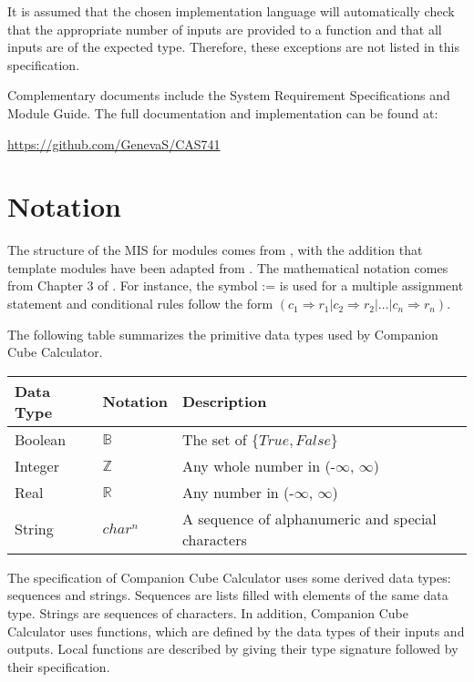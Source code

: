 \documentclass[12pt, titlepage]{article}
\newcommand{\progname}{Companion Cube Calculator}
\begin{document}
It is assumed that the chosen implementation language will automatically check 
that the appropriate number of inputs are provided to a function and that all 
inputs are of the expected type. Therefore, these exceptions are not listed in 
this specification.

Complementary documents include the System Requirement Specifications
and Module Guide. The full documentation and implementation can be
found at:
\begin{center}
	\href{https://github.com/GenevaS/CAS741}{https://github.com/GenevaS/CAS741}
\end{center}

\newpage

\section{Notation}
The structure of the MIS for modules comes from \citet{HoffmanAndStrooper1995},
with the addition that template modules have been adapted from
\cite{GhezziEtAl2003}.  The mathematical notation comes from Chapter 3 of
\citet{HoffmanAndStrooper1995}.  For instance, the symbol := is used for a
multiple assignment statement and conditional rules follow the form $(c_1
\Rightarrow r_1 | c_2 \Rightarrow r_2 | ... | c_n \Rightarrow r_n )$.

The following table summarizes the primitive data types used by \progname. 

\begin{center}
\renewcommand{\arraystretch}{1.2}
\noindent 
\begin{tabular}{l l p{7.5cm}} 
\toprule 
\textbf{Data Type} & \textbf{Notation} & \textbf{Description}\\ 
\midrule
Boolean & $\mathbb{B}$ & The set of $\{True, False\}$\\
Integer & $\mathbb{Z}$ & Any whole number in (-$\infty$, $\infty$)\\
Real & $\mathbb{R}$ & Any number in (-$\infty$, $\infty$)\\
\multirow{2}{1cm}{String} & \multirow{2}{1cm}{$char^n$} & A sequence of 
alphanumeric and special characters\\
\bottomrule
\end{tabular} 
\end{center}

\noindent
The specification of \progname{} uses some derived data types: sequences and 
strings. Sequences are lists filled with elements of the same data type. Strings
are sequences of characters. In addition, \progname{} uses functions, which
are defined by the data types of their inputs and outputs. Local functions are
described by giving their type signature followed by their specification.
\end{document}

